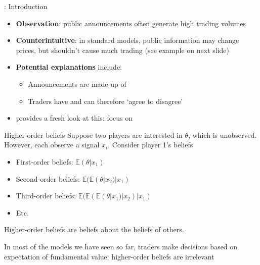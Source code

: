 \documentclass[english,10pt
,aspectratio=169
]{beamer}
\begin{document}

\begin{frame}{\cite{kondor_more_2012}: Introduction}
	\begin{itemize}
		\item \textbf{Observation}: public announcements often generate high trading volumes  
		\item \textbf{Counterintuitive}: in standard models, public information may change prices, but shouldn't cause much trading (see example on next slide)
		\item \textbf{Potential explanations} include:
		\begin{itemize}
			\item Announcements are made up of 
			\item Traders have  and can therefore `agree to disagree'
		\end{itemize}
		\item \textbf{\cite{kondor_more_2012}} provides a fresh look at this: focus on  
	\end{itemize}
\end{frame}


\begin{frame}{Higher-order beliefs}
	Suppose two players are interested in $\theta$, which is unobserved. However, each observe a signal $x_{i}$. Consider player 1's beliefs
	\begin{itemize}
		\item First-order beliefs: $\mathbb{E}(\theta|x_{1})$
		\item Second-order beliefs: $\mathbb{E}(\mathbb{E}(\theta|x_{2})|x_{1})$
		\item Third-order beliefs: $\mathbb{E}(\mathbb{E}(\mathbb{E}(\theta|x_{1})|x_{2})|x_{1})$
		\item Etc.
	\end{itemize}
	Higher-order beliefs are beliefs about the beliefs of others.

	In most of the models we have seen so far, traders make decisions based on expectation of fundamental value: higher-order beliefs are irrelevant
\end{frame}
\end{document}
